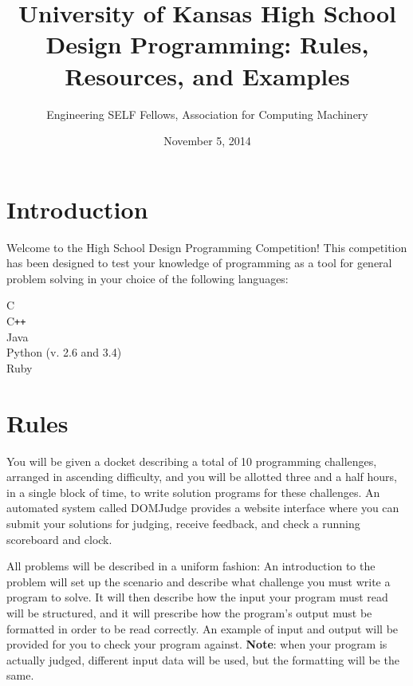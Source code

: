 \documentclass[a4paper]{article}
\title{University of Kansas High School Design Programming: Rules, Resources, and Examples}
\date{November 5, 2014}
\author{Engineering SELF Fellows, Association for Computing Machinery}
\begin{document}
\lstset{
    language=java,
    basicstyle=\ttfamily,
    numbers=left,
    numbersep=8pt,
    showspaces=false,
    showstringspaces=false
}
\maketitle

\tableofcontents

\newpage

\section{Introduction}

Welcome to the High School Design Programming Competition! This competition has been designed to test your knowledge of programming as a tool for general problem solving in your choice of the following languages:
\begin{center}
    C \\
    C\texttt{++} \\
    Java \\ 
    Python (v. 2.6 and 3.4) \\
    Ruby \\
\end{center}

\newpage

\section{Rules}

You will be given a docket describing a total of 10 programming challenges, arranged in ascending difficulty, and you will be allotted three and a half hours, in a single block of time, to write solution programs for these challenges. An automated system called DOMJudge provides a website interface where you can submit your solutions for judging, receive feedback, and check a running scoreboard and clock. 

All problems will be described in a uniform fashion: An introduction to the problem will set up the scenario and describe what challenge you must write a program to solve. It will then describe how the input your program must read will be structured, and it will prescribe how the program's output must be formatted in order to be read correctly. An example of input and output will be provided for you to check your program against. \textbf{Note}: when your program is actually judged, different input data will be used, but the formatting will be the same. 
\end{document}
